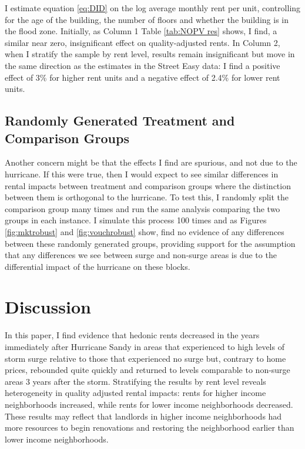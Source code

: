 \documentclass[12pt]{article}
\begin{document}
{{{{{I estimate equation \ref{eq:DID} on the log average monthly rent per unit, controlling for the age of the building, the number of floors  and whether the building is in the flood zone.   Initially, as Column 1 Table \ref{tab:NOPV res} shows, I find, a similar near zero, insignificant effect on quality-adjusted rents.  In Column 2, when I stratify the sample by rent level, results remain insignificant but move in the same direction as the estimates in the Street Easy data: I find a positive effect of 3\% for higher rent units and a negative effect of 2.4\% for lower rent units.  

\subsection{Randomly Generated Treatment and Comparison Groups}
Another concern might be that the effects I find are spurious, and not due to the hurricane.  If this were true, then I would expect to see similar differences in rental impacts between treatment and comparison groups where the distinction between them is orthogonal to the hurricane. To test this, I randomly split the comparison group many times and run the same analysis comparing the two groups in each instance.  I simulate this process 100 times and as Figures \ref{fig:mktrobust} and \ref{fig:vouchrobust}  show, find no evidence of any differences between these randomly generated groups, providing support for the assumption that any differences we see between surge and non-surge areas is due to the differential impact of the hurricane on these blocks. 

\section{Discussion} {\label{sec:Discussion}

In this paper, I find evidence that hedonic rents decreased in the years immediately after Hurricane Sandy in areas that experienced to high levels of storm surge relative to those that experienced no surge but, contrary to home prices, rebounded quite quickly and returned to levels comparable to non-surge areas 3 years after the storm.  Stratifying the results by rent level reveals heterogeneity in quality adjusted rental impacts: rents for higher income neighborhoods increased, while rents for lower income neighborhoods decreased.  These results may reflect that landlords in higher income neighborhoods had more resources to begin renovations and restoring the neighborhood earlier than lower income neighborhoods. 

}}}}}}
\end{document}
